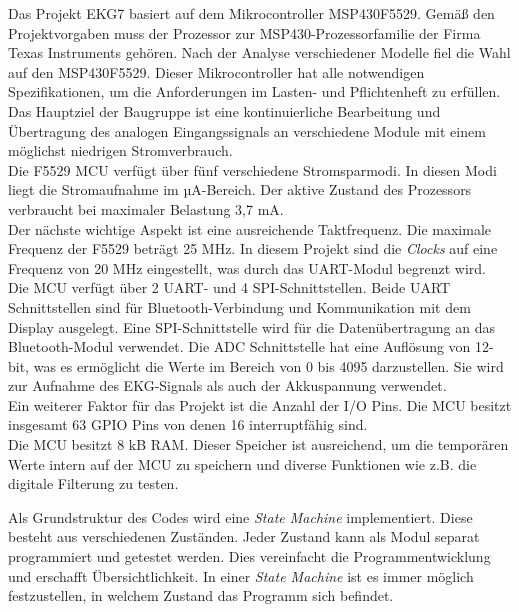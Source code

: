 Das Projekt EKG7 basiert auf dem Mikrocontroller MSP430F5529. \cite{MSP430F5529} Gemäß den Projektvorgaben muss der Prozessor zur MSP430-Prozessorfamilie der Firma Texas Instruments gehören. Nach der Analyse verschiedener Modelle fiel die Wahl auf den MSP430F5529. Dieser Mikrocontroller hat alle notwendigen Spezifikationen, um die Anforderungen im Lasten- und Pflichtenheft zu erfüllen.\\
Das Hauptziel der Baugruppe ist eine kontinuierliche Bearbeitung und Übertragung des analogen Eingangssignals an verschiedene Module mit einem möglichst niedrigen Stromverbrauch.\\
Die F5529 MCU verfügt über fünf verschiedene Stromsparmodi. In diesen Modi liegt die Stromaufnahme im µA-Bereich. Der aktive Zustand des Prozessors verbraucht bei maximaler Belastung 3,7 mA. \cite{Datenblatt_MSP430F5529}\\
Der nächste wichtige Aspekt ist eine ausreichende Taktfrequenz. Die maximale Frequenz der F5529 beträgt 25 MHz. In diesem Projekt sind die \textit{Clocks} auf eine Frequenz von 20 MHz eingestellt, was durch das UART-Modul begrenzt wird.\\
Die MCU verfügt über 2 UART- und 4 SPI-Schnittstellen. Beide UART Schnittstellen sind für Bluetooth-Verbindung und Kommunikation mit dem Display ausgelegt. Eine SPI-Schnittstelle wird für die Datenübertragung an das Bluetooth-Modul verwendet.
Die ADC Schnittstelle hat eine Auflösung von 12-bit, was es ermöglicht die Werte im Bereich von 0 bis 4095 darzustellen. Sie wird zur Aufnahme des EKG-Signals als auch der Akkuspannung verwendet.\\ 
Ein weiterer Faktor für das Projekt ist die Anzahl der I/O Pins. Die MCU besitzt insgesamt 63 GPIO Pins von denen 16 interruptfähig sind.\\
Die MCU besitzt 8 kB RAM. Dieser Speicher ist ausreichend, um die temporären Werte intern auf der MCU zu speichern und diverse Funktionen wie z.B. die digitale Filterung zu testen.

Als Grundstruktur des Codes wird eine \textit{State Machine} implementiert. Diese besteht aus verschiedenen Zuständen. Jeder Zustand kann als Modul separat programmiert und getestet werden. Dies vereinfacht die Programmentwicklung und erschafft Übersichtlichkeit. In einer \textit{State Machine} ist es immer möglich festzustellen, in welchem Zustand das Programm sich befindet.


